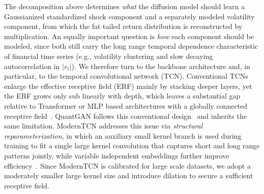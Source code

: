 \documentclass[sigconf,natbib=false]{acmart}
\begin{document}
The decomposition above determines \emph{what} the diffusion model should learn a Gaussianized standardized shock component and a separately modeled volatility component, from which the fat tailed return distribution is reconstructed by multiplication. An equally important question is \emph{how} each component should be modeled, since both still carry the long range temporal dependence characteristic of financial time series (e.g., volatility clustering and slow decaying autocorrelation in $|r_t|$). We therefore turn to the backbone architecture and, in particular, to the temporal convolutional network (TCN). Conventional TCNs enlarge the effective receptive field (ERF) mainly by stacking deeper layers, yet the ERF grows only sub linearly with depth, which leaves a substantial gap relative to Transformer or MLP based architectures with a globally connected receptive field~\cite{TCN, TCN2}. QuantGAN follows this conventional design~\cite{QuantGAN} and inherits the same limitation. ModernTCN addresses this issue via \emph{structural reparameterization}, in which an auxiliary small kernel branch is used during training to fit a single large kernel convolution that captures short and long range patterns jointly, while variable independent embeddings further improve efficiency~\cite{MordernTCNLuo24}. Since ModernTCN is calibrated for large scale datasets, we adopt a moderately smaller large kernel size and introduce dilation to secure a sufficient receptive field.
\end{document}
